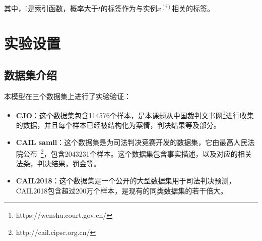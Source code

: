 其中，$\mathbb{I}$是索引函数，概率大于$t$的标签作为与实例$x^{(i)}$相关的标签。

\section{实验设置}
\label{sec:ran_exper}
\subsection{数据集介绍}
本模型在三个数据集上进行了实验验证：
\begin{itemize}
    \item \textbf{CJO}：这个数据集包含114576个样本，是本课题从中国裁判文书网\footnote{https://wenshu.court.gov.cn/}进行收集的数据，并且每个样本已经被结构化为案情，判决结果等及部分。
    \item \textbf{CAIL samll}：这个数据集是为司法判决竞赛开发的数据集，它由最高人民法院公布~\footnote{http://cail.cipsc.org.cn/}，包含2043231个样本。这个数据集包含事实描述，以及对应的相关法条，判决结果，罚金等。
    \item \textbf{CAIL2018}：这个数据集是一个公开的大型数据集\cite{zhong2018legal}用于司法判决预测，CAIL2018包含超过200万个样本，是现有的同类数据集的若干倍大。
\end{itemize}

